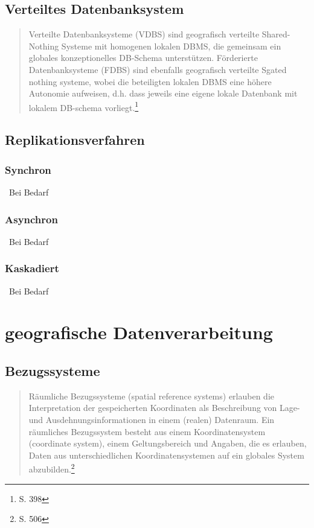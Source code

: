 \subsection{Verteiltes Datenbanksystem}

\begin{quote}
Verteilte Datenbanksysteme (VDBS) sind geografisch verteilte Shared-Nothing Systeme mit homogenen lokalen DBMS, die gemeinsam ein globales konzeptionelles DB-Schema unterstützen.
Förderierte Datenbanksysteme (FDBS) sind ebenfalls geografisch verteilte Sgated nothing systeme, wobei die beteiligten lokalen DBMS eine höhere Autonomie aufweisen, d.h. dass jeweils eine eigene lokale Datenbank mit lokalem DB-schema vorliegt.\footnote{\cite{book:kudrass} S. 398}
\end{quote}

\subsection{Replikationsverfahren}

\subsubsection{Synchron}\
Bei Bedarf

\subsubsection{Asynchron}\
Bei Bedarf

\subsubsection{Kaskadiert}\
Bei Bedarf

\newpage

\section{geografische Datenverarbeitung}

\subsection{Bezugssysteme}

\begin{quote}
Räumliche Bezugssysteme (spatial reference systems) erlauben die Interpretation der gespeicherten Koordinaten als Beschreibung von Lage- und Ausdehnungsinformationen in einem (realen) Datenraum. Ein räumliches Bezugssystem besteht aus einem Koordinatensystem (coordinate system), einem Geltungsbereich und Angaben, die es erlauben, Daten aus unterschiedlichen Koordinatensystemen auf ein globales System abzubilden.\footnote{\cite{book:kudrass} S. 506}
\end{quote}

